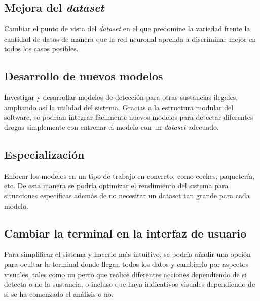 \subsection{Mejora del \textit{dataset}}
Cambiar el punto de vista del \textit{dataset} en el que predomine la variedad frente la cantidad de datos de manera que la red neuronal aprenda a discriminar mejor en todos los casos posibles.
 
\subsection{Desarrollo de nuevos modelos}
Investigar y desarrollar modelos de detección para otras sustancias ilegales, ampliando así la utilidad del sistema. Gracias a la estructura modular del software, se podrían integrar fácilmente nuevos modelos para detectar diferentes drogas simplemente con entrenar el modelo con un \textit{dataset} adecuado.

\subsection{Especialización} 
Enfocar los modelos en un tipo de trabajo en concreto, como coches, paquetería, etc. De esta manera se podría optimizar el rendimiento del sistema para situaciones específicas además de no necesitar un dataset tan grande para cada modelo.

\subsection{Cambiar la terminal en la interfaz de usuario} 
Para simplificar el sistema y hacerlo más intuitivo, se podría añadir una opción para ocultar la terminal donde llegan todos los datos y cambiarlo por aspectos visuales, tales como un perro que realice diferentes acciones dependiendo de si detecta o no la sustancia, o incluso que haya indicativos visuales dependiendo de si se ha comenzado el análisis o no.
